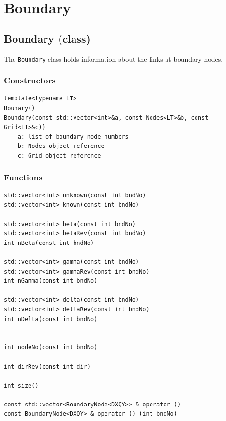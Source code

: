 \documentclass[11pt,a4paper]{report}
\begin{document}
\section{Boundary}
\subsection{Boundary (class)}
The \texttt{Boundary} class holds information about the links at boundary nodes.
\subsubsection{Constructors}

\begin{verbatim}
template<typename LT>	
Bounary() 
Boundary(const std::vector<int>&a, const Nodes<LT>&b, const Grid<LT>&c)}
    a: list of boundary node numbers
    b: Nodes object reference
    c: Grid object reference
\end{verbatim}	

\subsubsection{Functions}
\begin{verbatim}
std::vector<int> unknown(const int bndNo)
std::vector<int> known(const int bndNo)

std::vector<int> beta(const int bndNo)
std::vector<int> betaRev(const int bndNo)
int nBeta(const int bndNo)

std::vector<int> gamma(const int bndNo)
std::vector<int> gammaRev(const int bndNo)
int nGamma(const int bndNo)

std::vector<int> delta(const int bndNo)
std::vector<int> deltaRev(const int bndNo)
int nDelta(const int bndNo)


int nodeNo(const int bndNo)

int dirRev(const int dir)

int size()

const std::vector<BoundaryNode<DXQY>> & operator ()
const BoundaryNode<DXQY> & operator () (int bndNo)

\end{verbatim}

\renewcommand\bibname{References}

 	
 	
\end{document}
